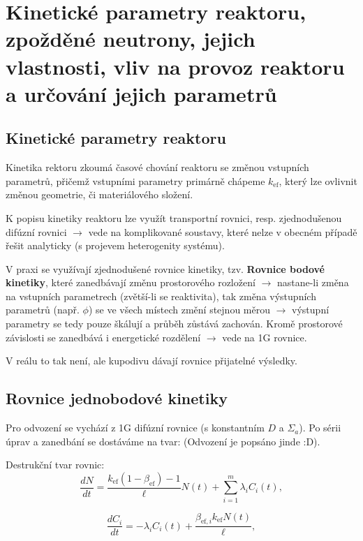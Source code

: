 \section[Měření kinetických parametrů]{Kinetické parametry reaktoru, zpožděné neutrony, jejich vlastnosti, vliv na provoz reaktoru a určování jejich parametrů}

\subsection{Kinetické parametry reaktoru}
Kinetika rektoru zkoumá časové chování reaktoru se změnou vstupních parametrů, přičemž vstupními parametry primárně chápeme $k_\text{ef}$, který lze ovlivnit změnou geometrie, či materiálového složení. 

K popisu kinetiky reaktoru lze využít transportní rovnici, resp. zjednodušenou difúzní rovnici $\rightarrow$ vede na komplikované soustavy, které nelze v obecném případě řešit analyticky (s projevem heterogenity systému).

V praxi se využívají zjednodušené rovnice kinetiky, tzv. \textbf{Rovnice bodové kinetiky}, které zanedbávají změnu prostorového rozložení $\rightarrow$ nastane-li změna na vstupních parametrech (zvětší-li se reaktivita), tak změna výstupních parametrů (např. $\phi$) se ve všech místech změní stejnou měrou $\rightarrow$ výstupní parametry se tedy pouze škálují a průběh zůstává zachován. Kromě prostorové závislosti se zanedbává i energetické rozdělení $\rightarrow$ vede na 1G rovnice.

V reálu to tak není, ale kupodivu dávají rovnice přijatelné výsledky.

\subsection{Rovnice jednobodové kinetiky}
Pro odvození se vychází z 1G difúzní rovnice (s konstantním $D$ a $\Sigma_a$). Po sérii úprav a zanedbání se dostáváme na tvar: (Odvození je popsáno jinde :D).

Destrukční tvar rovnic:
\begin{equation}
  \boxed{
  \dfrac{dN}{dt} = \dfrac{k_{\text{ef}}(1-\beta_{\text{ef}})-1}{\ell} N(t) + \sum_{i=1}^m \lambda_i C_i(t),
  \label{rovnice_kinetiky_zpozdenky_1}}
\end{equation}

\begin{equation}
  \boxed{
  \dfrac{dC_i}{dt} = -\lambda_i C_i(t) + \dfrac{\beta_{\text{ef},i} k_{\text{ef}} N(t)}{\ell},
  \label{rovnice_kinetiky_zpozdenky_2}}
\end{equation}

